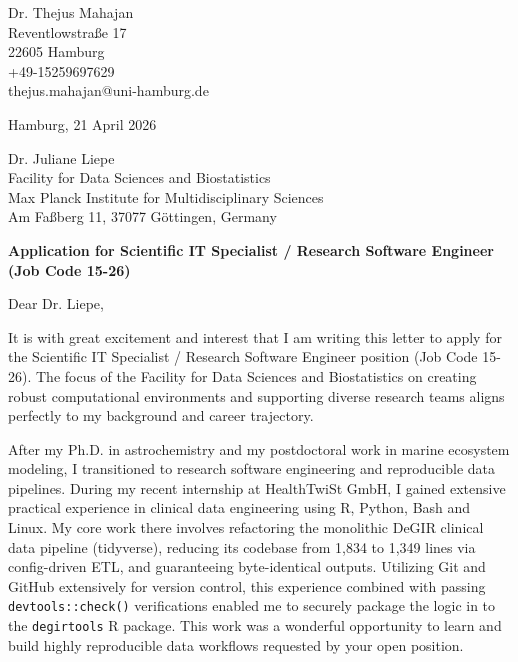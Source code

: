 \documentclass[11pt, a4paper]{article}
\begin{document}
\pagestyle{empty}

\begin{flushleft}
Dr. Thejus Mahajan\\
Reventlowstra{\ss}e 17\\
22605 Hamburg\\
+49-15259697629\\
thejus.mahajan@uni-hamburg.de
\end{flushleft}

\vspace{0.3cm}

\begin{flushright}
Hamburg, 21 April 2026
\end{flushright}

\vspace{0.3cm}

\begin{flushleft}
Dr. Juliane Liepe\\
Facility for Data Sciences and Biostatistics\\
Max Planck Institute for Multidisciplinary Sciences\\
Am Fa{\ss}berg 11, 37077 G\"ottingen, Germany
\end{flushleft}

\vspace{0.3cm}

\textbf{Application for Scientific IT Specialist / Research Software Engineer (Job Code 15-26)}

Dear Dr. Liepe,

It is with great excitement and interest that I am writing this letter to apply for the Scientific IT Specialist / Research Software Engineer position (Job Code 15-26). The focus of the Facility for Data Sciences and Biostatistics on creating robust computational environments and supporting diverse research teams aligns perfectly to my background and career trajectory.

After my Ph.D. in astrochemistry and my postdoctoral work in marine ecosystem modeling, I transitioned to research software engineering and reproducible data pipelines. During my recent internship at HealthTwiSt GmbH, I gained extensive practical experience in clinical data engineering using R, Python, Bash and Linux. My core work there involves refactoring the monolithic DeGIR clinical data pipeline (tidyverse), reducing its codebase from 1,834 to 1,349 lines via config-driven ETL, and guaranteeing byte-identical outputs. Utilizing Git and GitHub extensively for version control, this experience combined with passing \texttt{devtools::check()} verifications enabled me to securely package the logic in to the \texttt{degirtools} R package. This work was a wonderful opportunity to learn and build highly reproducible data workflows requested by your open position.
\end{document}

